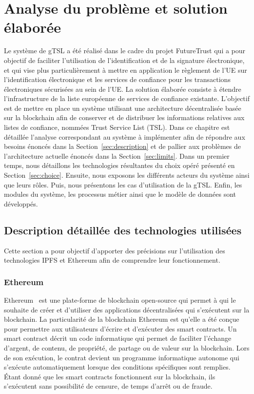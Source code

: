 \documentclass{tnreport}
\begin{document}
\chapter{Analyse du problème et solution élaborée}
\label{chap:analyse}

Le système de gTSL a été réalisé dans le cadre du projet FutureTrust qui a pour objectif de faciliter l'utilisation de l'identification et de la signature électronique, et qui vise plus particulièrement à mettre en application le règlement de l'UE sur l'identification électronique et les services de confiance pour les transactions électroniques sécurisées au sein de l'UE.
La solution élaborée consiste à étendre l'infrastructure de la liste européenne de services de confiance existante. L'objectif est de mettre en place un système utilisant une architecture décentralisée basée sur la blockchain afin de conserver et de distribuer les informations relatives aux listes de confiance, nommées Trust Service List (TSL). Dans ce chapitre est détaillée l'analyse correspondant au système à implémenter afin de répondre aux besoins énoncés dans la Section~\ref{sec:description} et de pallier aux problèmes de l'architecture actuelle énoncés dans la Section~\ref{sec:limits}. Dans un premier temps, nous détaillons les technologies résultantes du choix opéré présenté en Section~\ref{sec:choice}. Ensuite, nous exposons les différents acteurs du système ainsi que leurs rôles. Puis, nous présentons les cas d'utilisation de la gTSL. Enfin, les modules du système, les processus métier ainsi que le modèle de données sont développés.

\section{Description détaillée des technologies utilisées}

Cette section a pour objectif d'apporter des précisions sur l'utilisation des technologies IPFS et Ethereum afin de comprendre leur fonctionnement.

\subsection{Ethereum}

Ethereum~\cite{eth} est une plate-forme de blockchain open-source qui permet à qui le souhaite de créer et d'utiliser des applications décentralisées qui s'exécutent sur la blockchain. 
La particularité de la blockchain Ethereum est qu'elle a été conçue pour permettre aux utilisateurs d'écrire et d'exécuter des smart contracts. Un smart contract décrit un code informatique qui permet de faciliter l'échange d'argent, de contenu, de propriété, de partage ou de valeur sur la blockchain.
Lors de son exécution, le contrat devient un programme informatique autonome qui s'exécute automatiquement lorsque des conditions spécifiques sont remplies. Étant donné que les smart contracts fonctionnent sur la blockchain, ils s'exécutent sans possibilité de censure, de temps d'arrêt ou de fraude. 
\end{document}
